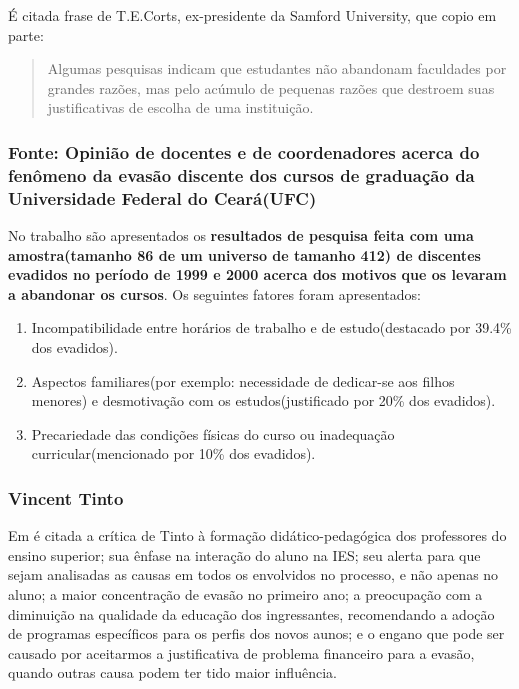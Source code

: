 \documentclass{report}
\begin{document}
É citada frase de T.E.Corts, ex-presidente da Samford University, que copio em parte:
\begin{quote}
Algumas pesquisas indicam que estudantes não abandonam faculdades por grandes razões, mas pelo acúmulo de pequenas razões que destroem suas justificativas de escolha de uma instituição.
\end{quote}

\subsubsection{Fonte: Opinião de docentes e de coordenadores acerca do fenômeno da evasão discente dos cursos de graduação da Universidade Federal do Ceará(UFC)}

No trabalho \cite{andriola} são apresentados os \textbf{resultados de pesquisa feita com uma amostra(tamanho 86 de um universo de tamanho 412) de discentes evadidos no período de 1999 e 2000 acerca dos motivos que os levaram a abandonar os cursos}. Os seguintes fatores foram apresentados:

\begin{enumerate}

\item Incompatibilidade entre horários de trabalho e de estudo(destacado por 39.4\% dos evadidos).

\item Aspectos familiares(por exemplo: necessidade de dedicar-se aos filhos menores) e desmotivação com os estudos(justificado por 20\% dos evadidos).

\item Precariedade das condições físicas do curso ou inadequação curricular(mencionado por 10\% dos evadidos).

\end{enumerate}


\subsubsection{Vincent Tinto}

Em \cite{evasao_panorama2} é citada a crítica de Tinto à formação didático-pedagógica dos professores do ensino superior; sua ênfase na interação do aluno na IES; seu alerta para que sejam analisadas as causas em todos os envolvidos no processo, e não apenas no aluno; a maior concentração de evasão no primeiro ano; a preocupação com a diminuição na qualidade da educação dos ingressantes, recomendando a adoção de programas específicos para os perfis dos novos aunos; e o engano que pode ser causado por aceitarmos a justificativa de problema financeiro para a evasão, quando outras causa podem ter tido maior influência.
\end{document}
